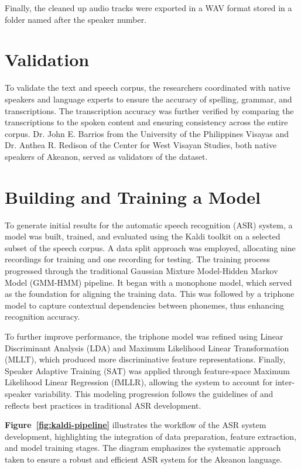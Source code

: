 Finally, the cleaned up audio tracks were exported in a WAV format stored in a folder named after the speaker number.

\section{Validation}

To validate the text and speech corpus, the researchers coordinated with native speakers and language experts to ensure the accuracy of spelling, grammar, and transcriptions. The transcription accuracy was further verified by comparing the transcriptions to the spoken content and ensuring consistency across the entire corpus. Dr. John E. Barrios from the University of the Philippines Visayas and Dr. Anthea R. Redison of the Center for West Visayan Studies, both native speakers of Akeanon, served as validators of the dataset.

\section{Building and Training a Model}

To generate initial results for the automatic speech recognition (ASR) system, a model was built, trained, and evaluated using the Kaldi toolkit on a selected subset of the speech corpus. A data split approach was employed, allocating nine recordings for training and one recording for testing. The training process progressed through the traditional Gaussian Mixture Model-Hidden Markov Model (GMM-HMM) pipeline. It began with a monophone model, which served as the foundation for aligning the training data. This was followed by a triphone model to capture contextual dependencies between phonemes, thus enhancing recognition accuracy.

To further improve performance, the triphone model was refined using Linear Discriminant Analysis (LDA) and Maximum Likelihood Linear Transformation (MLLT), which produced more discriminative feature representations. Finally, Speaker Adaptive Training (SAT) was applied through feature-space Maximum Likelihood Linear Regression (fMLLR), allowing the system to account for inter-speaker variability. This modeling progression follows the guidelines of  and reflects best practices in traditional ASR development.

\textbf{Figure~\ref{fig:kaldi-pipeline}} illustrates the workflow of the ASR system development, highlighting the integration of data preparation, feature extraction, and model training stages. The diagram emphasizes the systematic approach taken to ensure a robust and efficient ASR system for the Akeanon language.

